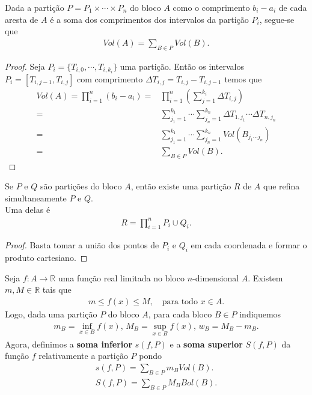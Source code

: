 \begin{theorem}
  Dada a partição $P=P_1\times\cdots\times P_n$ do bloco $A$ como o comprimento $b_i-a_i$ de cada aresta de $A$ é a soma dos comprimentos dos intervalos da partição $P_i$, segue-se que
  \begin{align*}
    Vol(A)=\sum_{B\in P}Vol(B).
  \end{align*}
\end{theorem}
\begin{proof} 
  Seja $P_i=\{T_{i,0},\cdots,T_{i,k_{i}}\}$ uma partição. Então os intervalos $P_i=[T_{i,j-1},T_{i,j}]$ com comprimento $\Delta T_{i,j}=T_{i,j}-T_{i,j-1}$ temos que
  \begin{align*}
    Vol(A)=\prod_{i=1}^{n}(b_i-a_i)=&\prod_{i=1}^{n}\left( \sum_{j=1}^{k_i}\Delta T_{i,j} \right)\\
    =&\sum_{j_1=1}^{k_1}\cdots\sum_{j_n=1}^{k_n}\Delta T_{1,j_1}\cdots\Delta T_{n,j_n}\\
    =&\sum_{j_1=1}^{k_1}\cdots\sum_{j_n=1}^{k_n}Vol(B_{j_1\cdots j_n})\\
    =&\sum_{B\in P}Vol(B).
  \end{align*}
\end{proof}
\begin{lemma}\label{lema:refinamento-comun}
  Se $P$ e $Q$ são partições do bloco $A$, então existe uma partição $R$ de $A$ que refina simultaneamente $P$ e $Q$.\\
  Uma delas é
  \begin{align*}
    R=\prod_{i=1}^{n}P_i\cup Q_i.
  \end{align*}
\end{lemma}
\begin{proof} 
  Basta tomar a união dos pontos de $P_i$ e $Q_i$ em cada coordenada e formar o produto cartesiano. 
\end{proof}
\begin{definition}
  Seja $f:A\to\mathbb{R}$ uma função real limitada no bloco $n$-dimensional $A$. Existem $m,M\in\mathbb{R}$ tais que
  \begin{align*}
    m\leq f(x)\leq M,\quad\text{para todo }x\in A.
  \end{align*}
  Logo, dada uma partição $P$ do bloco $A$, para cada bloco $B\in P$ indiquemos
  \begin{align*}
    m_{B}=\inf_{x\in B}f(x),\,M_B=\sup_{x\in B}f(x),\,w_{B}=M_B-m_B.
  \end{align*}
  Agora, definimos a \textbf{soma inferior} $s(f,P)$ e a \textbf{soma superior} $S(f,P)$ da função $f$ relativamente a partição $P$ pondo
  \begin{align*}
    s(f,P)=\sum_{B\in P}m_B Vol(B).\\
    S(f,P)=\sum_{B\in P}M_B Bol(B).
  \end{align*}
\end{definition}
